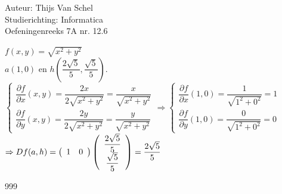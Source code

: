 \documentclass[a4paper]{article}
\begin{document}
  
\noindent \large Auteur: Thijs Van Schel \\
\noindent \large Studierichting: Informatica\\
\noindent \large Oefeningenreeks 7A nr. 12.6\\

\medskip

\normalsize

$f(x,y) = \sqrt{x^2 + y^2}$ \\

$a(1,0)$ en $h\left(\dfrac{2\sqrt{5}}{5}, \dfrac{\sqrt{5}}{5}\right)$. \\

$
\left\{ 
\begin{array}{l} 
\dfrac{\partial f}{\partial x}(x,y) = \dfrac{2x}{2\sqrt{x^2 + y^2}} = \dfrac{x}{\sqrt{x^2 + y^2}} \\ 
\dfrac{\partial f}{\partial y}(x,y) = \dfrac{2y}{2\sqrt{x^2 + y^2}} = \dfrac{y}{\sqrt{x^2 + y^2}} 
\end{array} 
\right.
\Rightarrow
\left\{ 
\begin{array}{l} 
\dfrac{\partial f}{\partial x}(1,0) = \dfrac{1}{\sqrt{1^2 + 0^2}} = 1 \\ 
\dfrac{\partial f}{\partial y}(1,0) = \dfrac{0}{\sqrt{1^2 + 0^2}} = 0 
\end{array} 
\right.
$ \\

$\Rightarrow Df(a,h) = \left(\begin{array}{c c} 1 & 0 \end{array}\right) \left(\begin{array}{c} \dfrac{2\sqrt{5}}{5} \\ \dfrac{\sqrt{5}}{5} \end{array}\right) = \dfrac{2\sqrt{5}}{5}$

\begin{thebibliography}{999}
\end{thebibliography}
\end{document}
